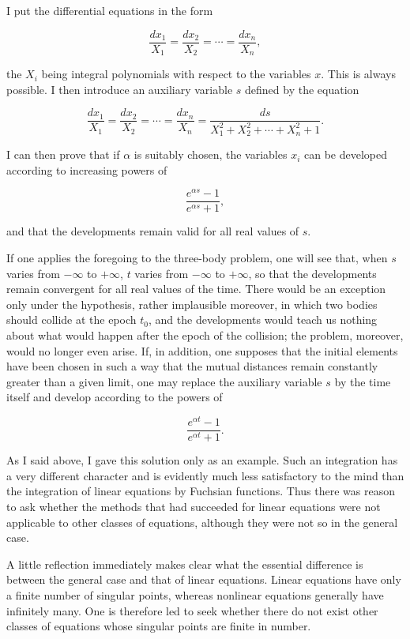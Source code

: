 \documentclass[11pt]{article}
\begin{document}
I put the differential equations in the form

\[
\frac{dx_1}{X_1}=\frac{dx_2}{X_2}=\cdots=\frac{dx_n}{X_n},
\]

the $X_i$ being integral polynomials with respect to the variables $x$. This is always possible. I then introduce an auxiliary variable $s$ defined by the equation

\[
\frac{dx_1}{X_1}=\frac{dx_2}{X_2}=\cdots=\frac{dx_n}{X_n}=\frac{ds}{X_1^2+X_2^2+\cdots+X_n^2+1}.
\]

I can then prove that if $\alpha$ is suitably chosen, the variables $x_i$ can be developed according to increasing powers of

\[
\frac{e^{\alpha s}-1}{e^{\alpha s}+1},
\]

and that the developments remain valid for all real values of $s$.

If one applies the foregoing to the three-body problem, one will see that, when $s$ varies from $-\infty$ to $+\infty$, $t$ varies from $-\infty$ to $+\infty$, so that the developments remain convergent for all real values of the time. There would be an exception only under the hypothesis, rather implausible moreover, in which two bodies should collide at the epoch $t_0$, and the developments would teach us nothing about what would happen after the epoch of the collision; the problem, moreover, would no longer even arise. If, in addition, one supposes that the initial elements have been chosen in such a way that the mutual distances remain constantly greater than a given limit, one may replace the auxiliary variable $s$ by the time itself and develop according to the powers of

\[
\frac{e^{\alpha t}-1}{e^{\alpha t}+1}.
\]

As I said above, I gave this solution only as an example. Such an integration has a very different character and is evidently much less satisfactory to the mind than the integration of linear equations by Fuchsian functions. Thus there was reason to ask whether the methods that had succeeded for linear equations were not applicable to other classes of equations, although they were not so in the general case.

A little reflection immediately makes clear what the essential difference is between the general case and that of linear equations. Linear equations have only a finite number of singular points, whereas nonlinear equations generally have infinitely many. One is therefore led to seek whether there do not exist other classes of equations whose singular points are finite in number.
\end{document}
